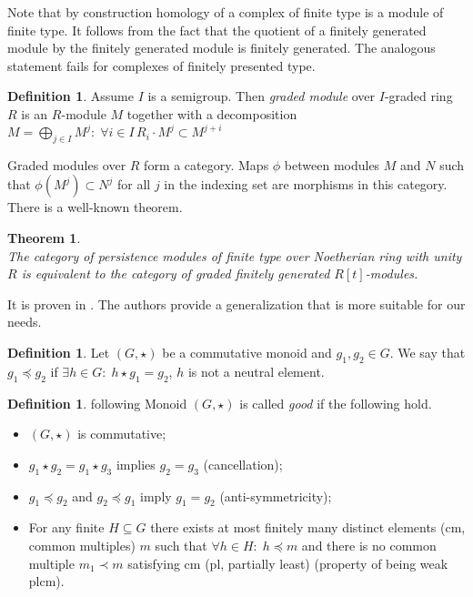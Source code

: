 \documentclass[a4paper, 12pt]{article}
\newcounter{stmcounter}[section]
\newcounter{thcounter}
\numberwithin{equation}{section}
\newtheorem{theorem}[thcounter]{Theorem}
\theoremstyle{definition}
\newtheorem{definition}[stmcounter]{Definition}
\theoremstyle{remark}
\newcommand{\define}[1]{{\textit{#1}}}
\begin{document}
Note that by construction homology of a complex of finite type is a module of finite type. It follows from the fact that the quotient of a finitely generated module by the finitely generated module is finitely generated. The analogous statement fails for complexes of finitely presented type.\\

\begin{definition}
  Assume $I$ is a semigroup. Then \define{graded module} over $I$-graded ring $R$ is an $R$-module $M$ together with a decomposition $M = \bigoplus_{j \in I} M^j:\; \forall i \in I\, R_i \cdot M^j \subset M^{j+i}$
\end{definition}

Graded modules over $R$ form a category. Maps $\phi$ between modules $M$ and $N$ such that $\phi(M^j) \subset N^j$ for all $j$ in the indexing set are morphisms in this category.\\

There is a well-known theorem.

\begin{theorem} {\cite[Theorem 3.1]{Zomorodian05}}\\
  The category of persistence modules of finite type over Noetherian ring with unity $R$ is equivalent to the category of graded finitely generated $R[t]$-modules.
\end{theorem}

It is proven in {\cite{Corbet18}}. The authors provide a generalization that is more suitable for our needs.\\

\begin{definition}
  Let $(G,\star)$ be a commutative monoid and $g_1, g_2 \in G$.
  We say that $g_1 \preceq g_2$ if $\exists h \in G:\; h \star g_1 = g_2$, $h$ is not a neutral element.
\end{definition}

\begin{definition} {following \cite[Definition 11]{Corbet18}}
  Monoid $(G,\star)$ is called \define{good} if the following hold.
  \begin{itemize}
    \item $(G, \star)$ is commutative;
    \item $g_1 \star g_2 = g_1 \star g_3$ implies $g_2 = g_3$ (cancellation);
    \item $g_1 \preceq g_2$ and $g_2 \preceq g_1$ imply $g_1 = g_2$ (anti-symmetricity);
    \item For any finite $H \subseteq G$ there exists at most finitely many distinct elements (cm, common multiples) $m$ such that $\forall h \in H:\; h \preceq m$ and there is no common multiple $m_1 \prec m$ satisfying cm (pl, partially least) (property of being weak plcm).
  \end{itemize}
\end{definition}
\end{document}
